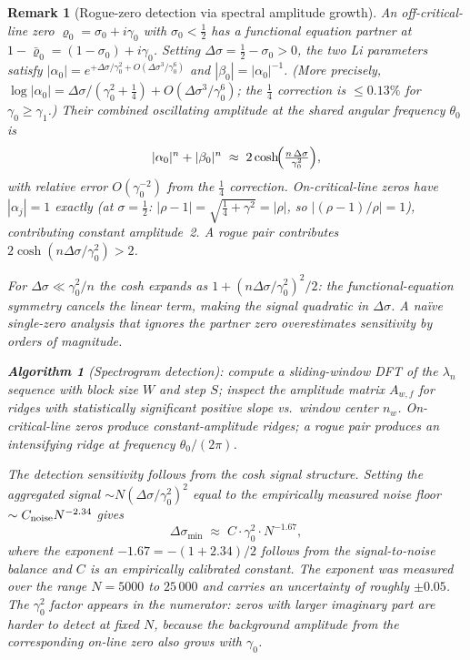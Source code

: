 \documentclass[11pt]{article}
\newtheorem{remark}[theorem]{Remark}
\begin{document}
\begin{remark}[Rogue-zero detection via spectral amplitude growth]
\label{rem:rogue_zero_exclusion}
An off-critical-line zero $\varrho_0 = \sigma_0 + i\gamma_0$ with $\sigma_0 < \tfrac{1}{2}$
has a functional equation partner at $1 - \bar\varrho_0 = (1-\sigma_0) + i\gamma_0$.
Setting $\Delta\sigma = \tfrac{1}{2} - \sigma_0 > 0$, the two Li parameters satisfy
$|\alpha_0| = e^{+\Delta\sigma/\gamma_0^2 + O(\Delta\sigma^3/\gamma_0^6)}$ and $|\beta_0| = |\alpha_0|^{-1}$.
(More precisely, $\log|\alpha_0| = \Delta\sigma/(\gamma_0^2 + \tfrac{1}{4}) + O(\Delta\sigma^3/\gamma_0^6)$;
the $\tfrac{1}{4}$ correction is $\le 0.13\%$ for $\gamma_0 \ge \gamma_1$.)
Their combined oscillating amplitude at the shared angular frequency $\theta_0$ is
\begin{equation}
  |\alpha_0|^n + |\beta_0|^n \;\approx\; 2\cosh\!\Bigl(\tfrac{n\,\Delta\sigma}{\gamma_0^2}\Bigr),
\end{equation}
with relative error $O(\gamma_0^{-2})$ from the $\tfrac{1}{4}$ correction.
On-critical-line zeros have $|\alpha_j| = 1$ exactly
(at $\sigma=\tfrac{1}{2}$: $|\rho-1| = \sqrt{\tfrac{1}{4}+\gamma^2} = |\rho|$, so $|(\rho-1)/\rho|=1$), contributing
constant amplitude~2. A rogue pair contributes $2\cosh(n\Delta\sigma/\gamma_0^2) > 2$.

For $\Delta\sigma \ll \gamma_0^2/n$ the cosh expands as $1 + (n\Delta\sigma/\gamma_0^2)^2/2$:
the functional-equation symmetry cancels the linear term, making the signal
\emph{quadratic} in $\Delta\sigma$. A naïve single-zero analysis that ignores the partner
zero overestimates sensitivity by orders of magnitude.

\textbf{Algorithm 1} (Spectrogram detection): compute a sliding-window DFT of the $\lambda_n$
sequence with block size $W$ and step $S$; inspect the amplitude matrix $A_{w,f}$ for ridges with
statistically significant positive slope vs.\ window center $n_w$.  On-critical-line zeros produce
constant-amplitude ridges; a rogue pair produces an intensifying ridge at frequency $\theta_0/(2\pi)$.

The detection sensitivity follows from the cosh signal structure.  Setting the aggregated signal
$\sim N(\Delta\sigma/\gamma_0^2)^2$ equal to the empirically measured noise floor
$\sim C_{\rm noise} N^{-2.34}$ gives
\begin{equation}
  \Delta\sigma_{\min} \;\approx\; C \cdot \gamma_0^2 \cdot N^{-1.67},
  \label{eq:rogue_resolution}
\end{equation}
where the exponent $-1.67 = -(1 + 2.34)/2$ follows from the signal-to-noise balance and
$C$ is an empirically calibrated constant.  The exponent was measured over the range
$N = 5000$ to $25\,000$ and carries an uncertainty of roughly $\pm 0.05$.  The $\gamma_0^2$
factor appears in the \emph{numerator}: zeros with larger imaginary part are harder to detect
at fixed $N$, because the background amplitude from the corresponding on-line zero also grows
with $\gamma_0$.


\end{remark}
\end{document}
